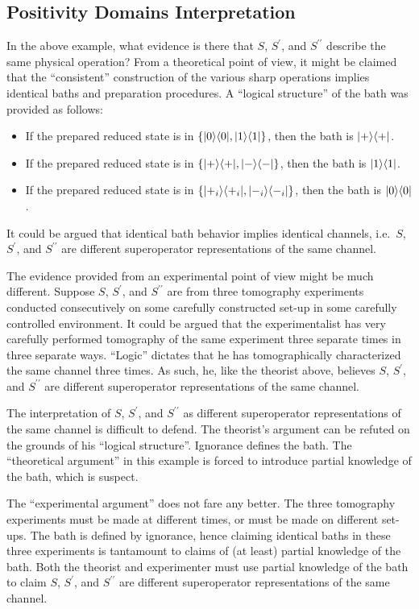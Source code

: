 \subsection{Positivity Domains Interpretation}
In the above example, what evidence is there that $S$, $S^\prime$, and $S^{\prime\prime}$ describe the same physical operation?  From a theoretical point of view, it might be claimed that the ``consistent'' construction of the various sharp operations implies identical baths and preparation procedures.  A ``logical structure'' of the bath was provided as follows:
\begin{itemize}
\item If the prepared reduced state is in $\{|0\rangle\langle0|,|1\rangle\langle1|\}$, then the bath is $|+\rangle\langle+|$.
\item If the prepared reduced state is in $\{|+\rangle\langle+|,|-\rangle\langle-|\}$, then the bath is $|1\rangle\langle1|$.
\item If the prepared reduced state is in $\{|+_i\rangle\langle+_i|,|-_i\rangle\langle-_i|\}$, then the bath is $|0\rangle\langle0|$.
\end{itemize}
It could be argued that identical bath behavior implies identical channels, i.e.\ $S$, $S^\prime$, and $S^{\prime\prime}$ are different superoperator representations of the same channel. 

The evidence provided from an experimental point of view might be much different.  Suppose $S$, $S^\prime$, and $S^{\prime\prime}$ are from three tomography experiments conducted consecutively on some carefully constructed set-up in some carefully controlled environment.  It could be argued that the experimentalist has very carefully performed tomography of the same experiment three separate times in three separate ways.  ``Logic'' dictates that he has tomographically characterized the same channel three times.  As such, he, like the theorist above, believes $S$, $S^\prime$, and $S^{\prime\prime}$ are different superoperator representations of the same channel.

The interpretation of $S$, $S^\prime$, and $S^{\prime\prime}$ as different superoperator representations of the same channel is difficult to defend.  The theorist's argument can be refuted on the grounds of his ``logical structure''.  Ignorance defines the bath.  The ``theoretical argument'' in this example is forced to introduce partial knowledge of the bath, which is suspect.

The ``experimental argument'' does not fare any better.  The three tomography experiments must be made at different times, or must be made on different set-ups.  The bath is defined by ignorance, hence claiming identical baths in these three experiments is tantamount to claims of (at least) partial knowledge of the bath.  Both the theorist and experimenter must use partial knowledge of the bath to claim $S$, $S^\prime$, and $S^{\prime\prime}$ are different superoperator representations of the same channel.

